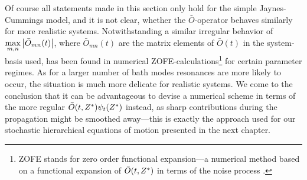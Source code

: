 Of course all statements made in this section only hold for the simple Jaynes-Cummings model, and it is not clear, whether the $\bar O$-operator behaves similarly for more realistic systems.
Notwithstanding a similar irregular behavior of $\max\limits_{m,n} \left\vert \bar O_{mn}(t) \right\vert$, where $\bar O_{mn}(t)$ are the matrix elements of $\bar O(t)$ in the system-basis used, has been found in numerical ZOFE-calculations\footnote{%
  ZOFE stands for zero order functional expansion---a numerical method based on a functional expansion of $\bar O(t, {Z}^*)$ in terms of the noise process \cite{}.
}
for certain parameter regimes.
As for a larger number of bath modes resonances are more likely to occur, the situation is much more delicate for realistic systems.
We come to the conclusion that it can be advantageous to devise a numerical scheme in terms of the more regular $\bar O(t, \ZZ) \psitZ$ instead, as sharp contributions during the propagation might be smoothed away---this is exactly the approach used for our stochastic hierarchical equations of motion presented in the next chapter.
